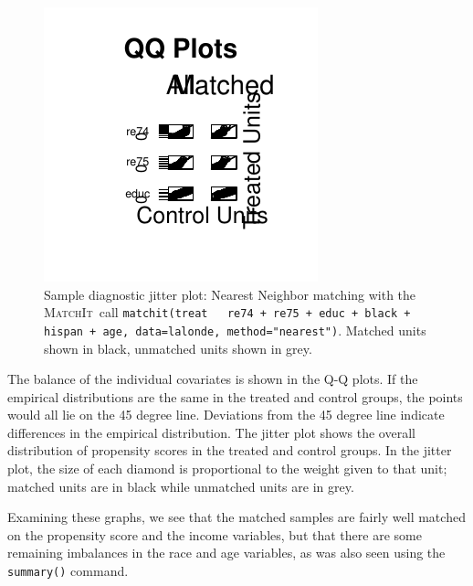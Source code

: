 \documentclass[oneside,letterpaper,titlepage]{article}
\newcommand{\MatchIt}{\textsc{MatchIt}}
\begin{document}
\begin{figure}[tbp]
  \begin{center}
\includegraphics{figs/docs-032}
    \hfill
    \caption{Sample diagnostic jitter plot: Nearest Neighbor matching
      with the \MatchIt\ call \texttt{matchit(treat ~ re74 + re75 +
        educ + black + hispan + age, data=lalonde, method="nearest")}.
      Matched units shown in black, unmatched units shown in grey.}
    \label{diagjitternn}
  \end{center}
\end{figure}

The balance of the individual covariates is shown in the Q-Q plots.
If the empirical distributions are the same in the treated and control
groups, the points would all lie on the 45 degree line.  Deviations
from the 45 degree line indicate differences in the empirical
distribution.  The jitter plot shows the overall distribution of
propensity scores in the treated and control groups.  In the jitter
plot, the size of each diamond is proportional to the weight given to
that unit; matched units are in black while unmatched units are in
grey.

Examining these graphs, we see that the matched samples are fairly
well matched on the propensity score and the income variables, but
that there are some remaining imbalances in the race and age
variables, as was also seen using the \texttt{summary()} command.
\end{document}
